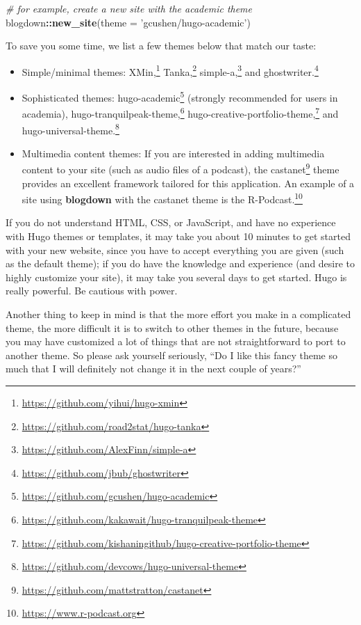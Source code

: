 \documentclass[12pt,]{krantz}
\makeatletter
\newenvironment{Shaded}{\begin{snugshade}}{\end{snugshade}}
\newcommand{\KeywordTok}[1]{\textcolor[rgb]{0.13,0.29,0.53}{\textbf{#1}}}
\newcommand{\DataTypeTok}[1]{\textcolor[rgb]{0.13,0.29,0.53}{#1}}
\newcommand{\StringTok}[1]{\textcolor[rgb]{0.31,0.60,0.02}{#1}}
\newcommand{\CommentTok}[1]{\textcolor[rgb]{0.56,0.35,0.01}{\textit{#1}}}
\newcommand{\OperatorTok}[1]{\textcolor[rgb]{0.81,0.36,0.00}{\textbf{#1}}}
\newcommand{\NormalTok}[1]{#1}
\renewcommand{\href}[2]{#2\footnote{\url{#1}}}
\newenvironment{kframe}{%
\medskip{}
\setlength{\fboxsep}{.8em}
 \def\at@end@of@kframe{}%
 \ifinner\ifhmode%
  \def\at@end@of@kframe{\end{minipage}}%
  \begin{minipage}{\columnwidth}%
 \fi\fi%
 \def\FrameCommand##1{\hskip\@totalleftmargin \hskip-\fboxsep
 \colorbox{shadecolor}{##1}\hskip-\fboxsep
     \hskip-\linewidth \hskip-\@totalleftmargin \hskip\columnwidth}%
 \MakeFramed {\advance\hsize-\width
   \@totalleftmargin\z@ \linewidth\hsize
   \@setminipage}}%
 {\par\unskip\endMakeFramed%
 \at@end@of@kframe}
\renewenvironment{Shaded}{\begin{kframe}}{\end{kframe}}
\theoremstyle{definition}
\theoremstyle{definition}
\theoremstyle{definition}
\theoremstyle{remark}
\makeatother
\begin{document}
\begin{Shaded}
\begin{Highlighting}[]
\CommentTok{# for example, create a new site with the academic theme}
\NormalTok{blogdown}\OperatorTok{::}\KeywordTok{new_site}\NormalTok{(}\DataTypeTok{theme =} \StringTok{'gcushen/hugo-academic'}\NormalTok{)}
\end{Highlighting}
\end{Shaded}

To save you some time, we list a few themes below that match our taste:

\begin{itemize}
\item
  Simple/minimal themes:
  \href{https://github.com/yihui/hugo-xmin}{XMin,}
  \href{https://github.com/road2stat/hugo-tanka}{Tanka,}
  \href{https://github.com/AlexFinn/simple-a}{simple-a,} and
  \href{https://github.com/jbub/ghostwriter}{ghostwriter.}
\item
  Sophisticated themes:
  \href{https://github.com/gcushen/hugo-academic}{hugo-academic}
  (strongly recommended for users in academia),
  \href{https://github.com/kakawait/hugo-tranquilpeak-theme}{hugo-tranquilpeak-theme,}
  \href{https://github.com/kishaningithub/hugo-creative-portfolio-theme}{hugo-creative-portfolio-theme,}
  and
  \href{https://github.com/devcows/hugo-universal-theme}{hugo-universal-theme.}
\item
  Multimedia content themes: If you are interested in adding multimedia
  content to your site (such as audio files of a podcast), the
  \href{https://github.com/mattstratton/castanet}{castanet} theme
  provides an excellent framework tailored for this application. An
  example of a site using \textbf{blogdown} with the castanet theme is
  the \href{https://www.r-podcast.org}{R-Podcast.}
\end{itemize}

If you do not understand HTML, CSS, or JavaScript, and have no
experience with Hugo themes or templates, it may take you about 10
minutes to get started with your new website, since you have to accept
everything you are given (such as the default theme); if you do have the
knowledge and experience (and desire to highly customize your site), it
may take you several days to get started. Hugo is really powerful. Be
cautious with power.

Another thing to keep in mind is that the more effort you make in a
complicated theme, the more difficult it is to switch to other themes in
the future, because you may have customized a lot of things that are not
straightforward to port to another theme. So please ask yourself
seriously, ``Do I like this fancy theme so much that I will definitely
not change it in the next couple of years?''
\end{document}

